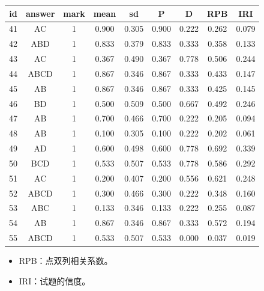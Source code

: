 \documentclass[hyperref,adobefonts]{ctexart}
\providecommand{\tightlist}{\setlength{\itemsep}{0pt}\setlength{\parskip}{0pt}}
\begin{document}
\begin{longtable}{c|c|c|c|c|c|c|c|c}
\hline
id & answer & mark & mean & sd & P & D & RPB & IRI\\
\hline
41 & AC & 1 & 0.900 & 0.305 & 0.900 & 0.222 & 0.262 & 0.079\\
\hline
42 & ABD & 1 & 0.833 & 0.379 & 0.833 & 0.333 & 0.358 & 0.133\\
\hline
43 & AC & 1 & 0.367 & 0.490 & 0.367 & 0.778 & 0.506 & 0.244\\
\hline
44 & ABCD & 1 & 0.867 & 0.346 & 0.867 & 0.333 & 0.433 & 0.147\\
\hline
45 & AB & 1 & 0.867 & 0.346 & 0.867 & 0.333 & 0.425 & 0.145\\
\hline
46 & BD & 1 & 0.500 & 0.509 & 0.500 & 0.667 & 0.492 & 0.246\\
\hline
47 & AB & 1 & 0.700 & 0.466 & 0.700 & 0.222 & 0.205 & 0.094\\
\hline
48 & AB & 1 & 0.100 & 0.305 & 0.100 & 0.222 & 0.202 & 0.061\\
\hline
49 & AD & 1 & 0.600 & 0.498 & 0.600 & 0.778 & 0.692 & 0.339\\
\hline
50 & BCD & 1 & 0.533 & 0.507 & 0.533 & 0.778 & 0.586 & 0.292\\
\hline
51 & AC & 1 & 0.200 & 0.407 & 0.200 & 0.556 & 0.621 & 0.248\\
\hline
52 & ABCD & 1 & 0.300 & 0.466 & 0.300 & 0.222 & 0.348 & 0.160\\
\hline
53 & ABC & 1 & 0.133 & 0.346 & 0.133 & 0.222 & 0.255 & 0.087\\
\hline
54 & AB & 1 & 0.867 & 0.346 & 0.867 & 0.333 & 0.572 & 0.194\\
\hline
55 & ABCD & 1 & 0.533 & 0.507 & 0.533 & 0.000 & 0.037 & 0.019\\
\hline
\end{longtable}

\begin{itemize}
\tightlist
\item
  RPB：点双列相关系数。
\item
  IRI：试题的信度。
\end{itemize}
\end{document}
